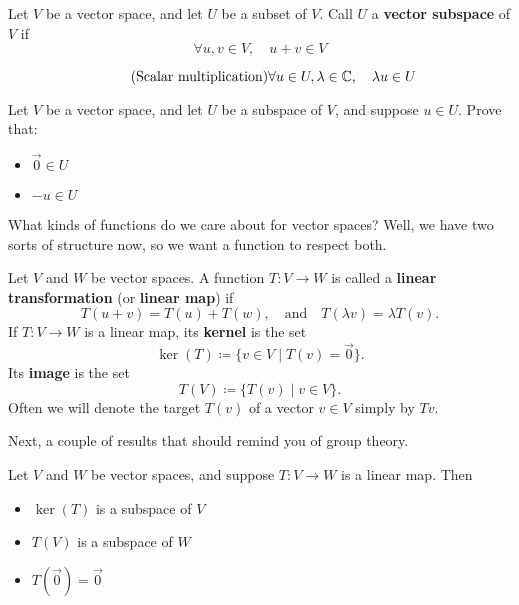 \begin{definition}[Subspace]
    Let $V$ be a vector space, and let $U$ be a subset of $V$.
    Call $U$ a {\bf vector subspace} of $V$ if
    \begin{equation*}\tag{Addition}
        \forall u,v\in V, \quad u+v\in V
    \end{equation*}

    \begin{equation*}\tag{Scalar multiplication}
        \forall u\in U, \lambda\in\mathbb{C}, \quad \lambda u\in U
    \end{equation*}
\end{definition}

\begin{exercise}
    Let $V$ be a vector space, and let $U$ be a subspace of $V$, and suppose $u\in U$.
    Prove that:
    \begin{itemize}
        \item $\vec{0} \in U$
        \item $-u\in U$ 
    \end{itemize}
\end{exercise}

What kinds of functions do we care about for vector spaces?
Well, we have two sorts of structure now, so we want a function to respect both.

\begin{definition}
    Let $V$ and $W$ be vector spaces.
    A function $T:V\to W$ is called a {\bf linear transformation} (or {\bf linear map}) if
    \[
        T(u+v) = T(u) + T(w), \quad \text{and} \quad T(\lambda v) = \lambda T(v).
    \]
    If $T:V\to W$ is a linear map, its {\bf kernel} is the set
    \[
        \ker(T) \coloneq \{v\in V \mid T(v)=\vec{0}\}.
    \]
    Its {\bf image} is the set
    \[
        T(V) \coloneq \{ T(v) \mid v\in V\}.
    \]
    Often we will denote the target $T(v)$ of a vector $v\in V$ simply by $Tv$.
\end{definition}

Next, a couple of results that should remind you of group theory.

\begin{proposition}
    Let $V$ and $W$ be vector spaces, and suppose $T:V\to W$ is a linear map.
    Then
    \begin{itemize}
        \item $\ker(T)$ is a subspace of $V$
        \item $T(V)$ is a subspace of $W$
        \item $T(\vec{0}) = \vec{0}$
    \end{itemize}
\end{proposition}

